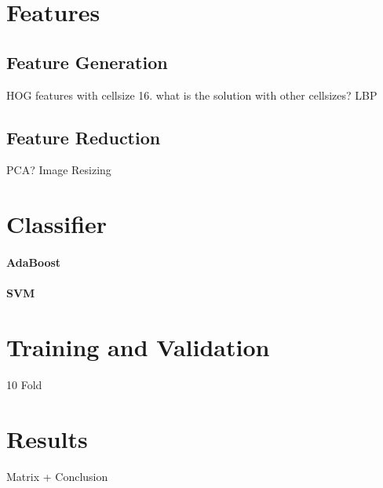 \documentclass[a4paper,10pt]{article}
\begin{document}
\section{Features}
\subsection{Feature Generation}
HOG features with cellsize 16. what is the solution with other cellsizes?
LBP

\subsection{Feature Reduction}
PCA? Image Resizing

\section{Classifier}
\paragraph{AdaBoost}
\paragraph{SVM}

\section{Training and Validation}
10 Fold

\section{Results}
Matrix + Conclusion 
\end{document}
